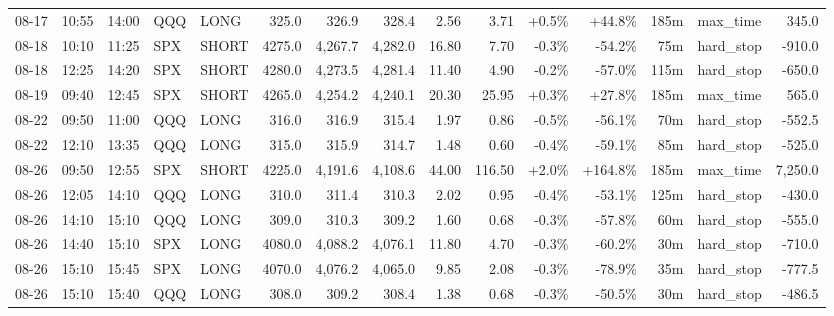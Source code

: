 \documentclass[11pt,a4paper,twoside]{article}
\begin{document}
\begin{landscape}
\begin{center}
\begin{longtable}{>{\color{txtmain}}l l l l l r r r r r r r r >{\color{txtmain}}l r}
08-17 & 10:55 & 14:00 & QQQ & LONG & 325.0 & 326.9 & 328.4 & 2.56 & 3.71 & \textcolor{wingreen}{+0.5\%} & \textcolor{wingreen}{+44.8\%} & 185m & max\_time & \textcolor{wingreen}{345.0} \\
08-18 & 10:10 & 11:25 & SPX & SHORT & 4275.0 & 4,267.7 & 4,282.0 & 16.80 & 7.70 & \textcolor{lossred}{-0.3\%} & \textcolor{lossred}{-54.2\%} & 75m & hard\_stop & \textcolor{lossred}{-910.0} \\
08-18 & 12:25 & 14:20 & SPX & SHORT & 4280.0 & 4,273.5 & 4,281.4 & 11.40 & 4.90 & \textcolor{lossred}{-0.2\%} & \textcolor{lossred}{-57.0\%} & 115m & hard\_stop & \textcolor{lossred}{-650.0} \\
08-19 & 09:40 & 12:45 & SPX & SHORT & 4265.0 & 4,254.2 & 4,240.1 & 20.30 & 25.95 & \textcolor{wingreen}{+0.3\%} & \textcolor{wingreen}{+27.8\%} & 185m & max\_time & \textcolor{wingreen}{565.0} \\
08-22 & 09:50 & 11:00 & QQQ & LONG & 316.0 & 316.9 & 315.4 & 1.97 & 0.86 & \textcolor{lossred}{-0.5\%} & \textcolor{lossred}{-56.1\%} & 70m & hard\_stop & \textcolor{lossred}{-552.5} \\
08-22 & 12:10 & 13:35 & QQQ & LONG & 315.0 & 315.9 & 314.7 & 1.48 & 0.60 & \textcolor{lossred}{-0.4\%} & \textcolor{lossred}{-59.1\%} & 85m & hard\_stop & \textcolor{lossred}{-525.0} \\
08-26 & 09:50 & 12:55 & SPX & SHORT & 4225.0 & 4,191.6 & 4,108.6 & 44.00 & 116.50 & \textcolor{wingreen}{+2.0\%} & \textcolor{wingreen}{+164.8\%} & 185m & max\_time & \textcolor{wingreen}{7,250.0} \\
08-26 & 12:05 & 14:10 & QQQ & LONG & 310.0 & 311.4 & 310.3 & 2.02 & 0.95 & \textcolor{lossred}{-0.4\%} & \textcolor{lossred}{-53.1\%} & 125m & hard\_stop & \textcolor{lossred}{-430.0} \\
08-26 & 14:10 & 15:10 & QQQ & LONG & 309.0 & 310.3 & 309.2 & 1.60 & 0.68 & \textcolor{lossred}{-0.3\%} & \textcolor{lossred}{-57.8\%} & 60m & hard\_stop & \textcolor{lossred}{-555.0} \\
08-26 & 14:40 & 15:10 & SPX & LONG & 4080.0 & 4,088.2 & 4,076.1 & 11.80 & 4.70 & \textcolor{lossred}{-0.3\%} & \textcolor{lossred}{-60.2\%} & 30m & hard\_stop & \textcolor{lossred}{-710.0} \\
08-26 & 15:10 & 15:45 & SPX & LONG & 4070.0 & 4,076.2 & 4,065.0 & 9.85 & 2.08 & \textcolor{lossred}{-0.3\%} & \textcolor{lossred}{-78.9\%} & 35m & hard\_stop & \textcolor{lossred}{-777.5} \\
08-26 & 15:10 & 15:40 & QQQ & LONG & 308.0 & 309.2 & 308.4 & 1.38 & 0.68 & \textcolor{lossred}{-0.3\%} & \textcolor{lossred}{-50.5\%} & 30m & hard\_stop & \textcolor{lossred}{-486.5} \\

\end{longtable}
\end{center}
\end{landscape}
\end{document}
